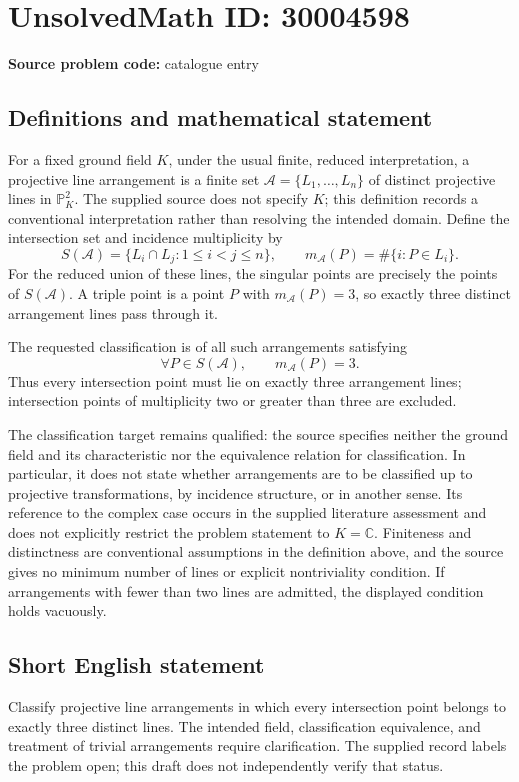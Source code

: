 \documentclass[11pt]{article}
\newcommand{\C}{\mathbb{C}}
\newcommand{\PP}{\mathbb{P}}
\begin{document}
\section*{UnsolvedMath ID: 30004598}
\textbf{Source problem code:} catalogue entry
\subsection{Definitions and mathematical statement}
For a fixed ground field \(K\), under the usual finite, reduced interpretation, a projective line arrangement is a finite set \(\mathcal A=\{L_1,\ldots,L_n\}\) of distinct projective lines in \(\PP^2_K\). The supplied source does not specify \(K\); this definition records a conventional interpretation rather than resolving the intended domain. Define the intersection set and incidence multiplicity by
\[
S(\mathcal A)=\{L_i\cap L_j:1\leq i<j\leq n\},
\qquad
m_{\mathcal A}(P)=\#\{i:P\in L_i\}.
\]
For the reduced union of these lines, the singular points are precisely the points of \(S(\mathcal A)\). A triple point is a point \(P\) with \(m_{\mathcal A}(P)=3\), so exactly three distinct arrangement lines pass through it.

The requested classification is of all such arrangements satisfying
\[
\forall P\in S(\mathcal A),\qquad m_{\mathcal A}(P)=3.
\]
Thus every intersection point must lie on exactly three arrangement lines; intersection points of multiplicity two or greater than three are excluded.

The classification target remains qualified: the source specifies neither the ground field and its characteristic nor the equivalence relation for classification. In particular, it does not state whether arrangements are to be classified up to projective transformations, by incidence structure, or in another sense. Its reference to the complex case occurs in the supplied literature assessment and does not explicitly restrict the problem statement to \(K=\C\). Finiteness and distinctness are conventional assumptions in the definition above, and the source gives no minimum number of lines or explicit nontriviality condition. If arrangements with fewer than two lines are admitted, the displayed condition holds vacuously.
\subsection{Short English statement}
Classify projective line arrangements in which every intersection point belongs to exactly three distinct lines. The intended field, classification equivalence, and treatment of trivial arrangements require clarification. The supplied record labels the problem open; this draft does not independently verify that status.
\end{document}
